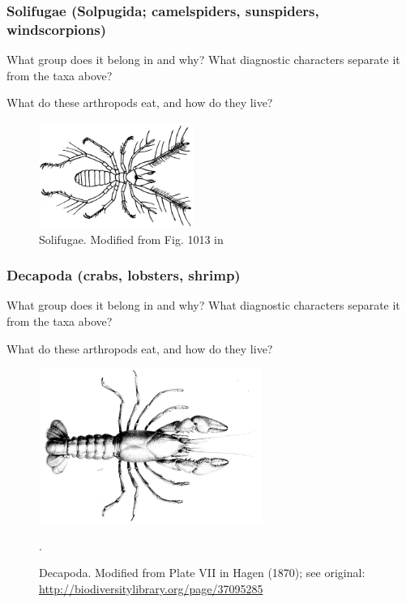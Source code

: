 \documentclass[letterpaper, 11pt]{article}
\begin{document}
\subsubsection*{Solifugae (Solpugida; camelspiders, sunspiders, windscorpions)}
What group does it belong in and why? What diagnostic characters separate it from the taxa above?\vspace{2cm}

\noindent{}What do these arthropods eat, and how do they live?\vspace{2cm}

\begin{figure}[ht!]
  \centering
    \includegraphics[width=0.45\textwidth]{solifugae1013.png}
  \caption{Solifugae. Modified from Fig. 1013 in \cite{bhlitem30465Insects}}
  \label{fig:solfugida}
\end{figure}

\subsubsection*{Decapoda (crabs, lobsters, shrimp)}
What group does it belong in and why? What diagnostic characters separate it from the taxa above?\vspace{2cm}

\noindent{}What do these arthropods eat, and how do they live?\vspace{2cm}

\begin{figure}[ht!]
  \centering
    \includegraphics[width=0.65\textwidth]{decapod}
  \caption{Decapoda. Modified from Plate VII in Hagen (1870); see original: \url{http://biodiversitylibrary.org/page/37095285}}.
  \label{fig:decapoda}
\end{figure}
\end{document}
